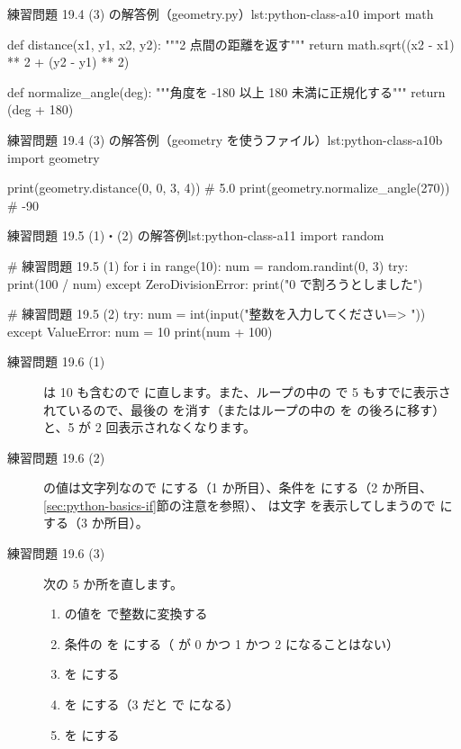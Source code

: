 \begin{codelisting}[style=python]{練習問題 19.4 (3) の解答例（geometry.py）}{lst:python-class-a10}
import math


def distance(x1, y1, x2, y2):
    """2 点間の距離を返す"""
    return math.sqrt((x2 - x1) ** 2 + (y2 - y1) ** 2)


def normalize_angle(deg):
    """角度を -180 以上 180 未満に正規化する"""
    return (deg + 180) %
\end{codelisting}

\begin{codelisting}[style=python]{練習問題 19.4 (3) の解答例（geometry を使うファイル）}{lst:python-class-a10b}
import geometry

print(geometry.distance(0, 0, 3, 4))    # 5.0
print(geometry.normalize_angle(270))    # -90
\end{codelisting}

\begin{codelisting}[style=python]{練習問題 19.5 (1)・(2) の解答例}{lst:python-class-a11}
import random

# 練習問題 19.5 (1)
for i in range(10):
    num = random.randint(0, 3)
    try:
        print(100 / num)
    except ZeroDivisionError:
        print("0 で割ろうとしました")

# 練習問題 19.5 (2)
try:
    num = int(input("整数を入力してください=> "))
except ValueError:
    num = 10
print(num + 100)
\end{codelisting}

\begin{description}
  \item[練習問題 19.6 (1)]  は 10 も含むので  に直します。また、ループの中の  で 5 もすでに表示されているので、最後の  を消す（またはループの中の  を  の後ろに移す）と、5 が 2 回表示されなくなります。
  \item[練習問題 19.6 (2)]  の値は文字列なので  にする（1 か所目）、条件を  にする（2 か所目、\ref{sec:python-basics-if}節の注意を参照）、 は文字  を表示してしまうので  にする（3 か所目）。
  \item[練習問題 19.6 (3)] 次の 5 か所を直します。
    \begin{enumerate}
      \item {} の値を  で整数に変換する
      \item 条件の  を  にする（ が 0 かつ 1 かつ 2 になることはない）
      \item {} を  にする
      \item {} を  にする（3 だと  で  になる）
      \item {} を  にする
    \end{enumerate}
\end{description}
